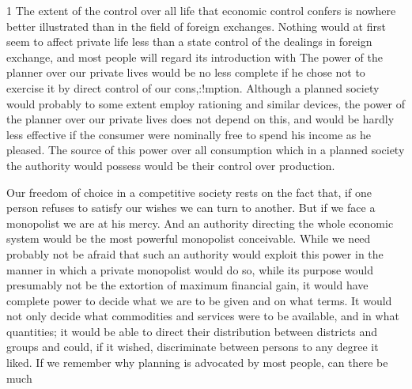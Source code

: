 \documentclass[11pt,openany]{book}
\begin{document}
\begin{center}\textasteriskcentered\hspace{0.9em}\textasteriskcentered\hspace{0.9em}\textasteriskcentered\end{center}

\begin{center}\textasteriskcentered\hspace{0.9em}\textasteriskcentered\hspace{0.9em}\textasteriskcentered\end{center}

\begin{center}\textasteriskcentered\hspace{0.9em}\textasteriskcentered\hspace{0.9em}\textasteriskcentered\end{center}

\begin{center}\textasteriskcentered\hspace{0.9em}\textasteriskcentered\hspace{0.9em}\textasteriskcentered\end{center}

1 The extent of the control over all life that economic control confers is nowhere better illustrated than in the field of foreign exchanges. Nothing would at first seem to affect private life less than a state control of the dealings in foreign exchange, and most people will regard its introduction with The power of the planner over our private lives would be no less complete if he chose not to exercise it by direct control of our cons,:!mption. Although a planned society would probably to some extent employ rationing and similar devices, the power of the planner over our private lives does not depend on this, and would be hardly less effective if the consumer were nominally free to spend his income as he pleased. The source of this power over all consumption which in a planned society the authority would possess would be their control over production.

Our freedom of choice in a competitive society rests on the fact that, if one person refuses to satisfy our wishes we can turn to another. But if we face a monopolist we are at his mercy. And an authority directing the whole economic system would be the most powerful monopolist conceivable. While we need probably not be afraid that such an authority would exploit this power in the manner in which a private monopolist would do so, while its purpose would presumably not be the extortion of maximum financial gain, it would have complete power to decide what we are to be given and on what terms. It would not only decide what commodities and services were to be available, and in what quantities; it would be able to direct their distribution between districts and groups and could, if it wished, discriminate between persons to any degree it liked. If we remember why planning is advocated by most people, can there be much
\end{document}
